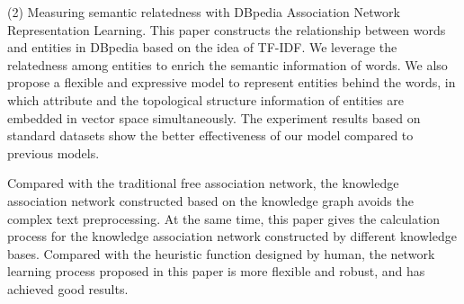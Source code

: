 \begin{englishabstract}
    (2) Measuring semantic relatedness with DBpedia Association Network Representation Learning. This paper constructs the relationship between words and entities in DBpedia based on the idea of TF-IDF. We leverage the relatedness among entities to enrich the semantic information of words. We also propose a flexible and expressive model to represent entities behind the words, in which attribute and the topological structure information of entities are embedded in vector space simultaneously. The experiment results based on standard datasets show the better effectiveness of our model compared to previous models.

    Compared with the traditional free association network, the knowledge association network constructed based on the knowledge graph avoids the complex text preprocessing. At the same time, this paper gives the calculation process for the knowledge association network constructed by different knowledge bases. Compared with the heuristic function designed by human, the network learning process proposed in this paper is more flexible and robust, and has achieved good results.


\end{englishabstract}



